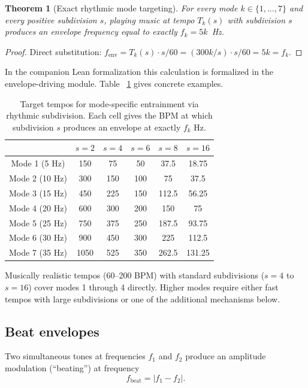 \documentclass[11pt,a4paper]{article}
\newtheorem{theorem}{Theorem}
\begin{document}
\begin{theorem}[Exact rhythmic mode targeting]
\label{thm:rhythm}
For every mode $k\in\{1,\ldots,7\}$ and every positive subdivision
$s$, playing music at tempo $T_k(s)$ with subdivision $s$ produces an
envelope frequency equal to exactly $f_k=5k$~Hz.
\end{theorem}

\begin{proof}
Direct substitution: $f_{\mathrm{env}} = T_k(s)\cdot s / 60
= (300k/s)\cdot s/60 = 5k = f_k$.
\end{proof}

\noindent In the companion Lean formalization this calculation is
formalized in the envelope-driving module. Table
~\ref{tab:targets} gives concrete examples.

\begin{table}[H]
\centering
\caption{Target tempos for mode-specific entrainment via rhythmic subdivision.
Each cell gives the BPM at which subdivision $s$ produces an envelope at
exactly $f_k$ Hz.}
\label{tab:targets}
\begin{tabular}{@{}c|ccccc@{}}
\toprule
& $s=2$ & $s=4$ & $s=6$ & $s=8$ & $s=16$ \\
\midrule
Mode 1 (5 Hz)  & 150 & 75  & 50  & 37.5 & 18.75 \\
Mode 2 (10 Hz) & 300 & 150 & 100 & 75   & 37.5  \\
Mode 3 (15 Hz) & 450 & 225 & 150 & 112.5 & 56.25 \\
Mode 4 (20 Hz) & 600 & 300 & 200 & 150  & 75    \\
Mode 5 (25 Hz) & 750 & 375 & 250 & 187.5 & 93.75 \\
Mode 6 (30 Hz) & 900 & 450 & 300 & 225  & 112.5 \\
Mode 7 (35 Hz) & 1050& 525 & 350 & 262.5 & 131.25\\
\bottomrule
\end{tabular}
\end{table}

\noindent Musically realistic tempos (60--200 BPM) with standard
subdivisions ($s=4$ to $s=16$) cover modes 1 through 4 directly. Higher
modes require either fast tempos with large subdivisions or one of the
additional mechanisms below.

\subsection{Beat envelopes}

Two simultaneous tones at frequencies $f_1$ and $f_2$ produce an
amplitude modulation (``beating'') at frequency
\begin{equation}
  \label{eq:beat}
  f_{\mathrm{beat}} = |f_1 - f_2|.
\end{equation}
\end{document}
